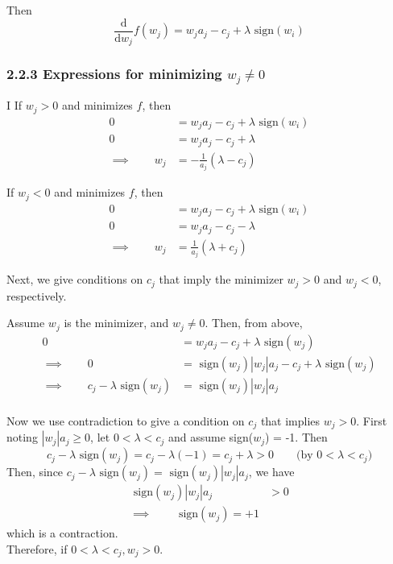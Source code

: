 \documentclass[paper=a4, fontsize=11pt]{scrartcl} %
\numberwithin{equation}{section} %
\numberwithin{figure}{section} %
\numberwithin{table}{section} %
\begin{document}
Then
\[\frac{\textrm{d}}{\textrm{d} w_j}f(w_j) = w_j a_j - c_j + \lambda \textrm{ sign}(w_i)\]

\subsubsection*{2.2.3 Expressions for minimizing $w_j \ne 0$}
I
If $w_j > 0$ and minimizes $f$, then
\begin{align*}
0 &= w_j a_j - c_j + \lambda \textrm{ sign}(w_i) \\
0 &= w_j a_j - c_j + \lambda \\
\implies \qquad{} w_j &= -\frac{1}{a_j} (\lambda - c_j)
\end{align*}

If $w_j < 0$ and minimizes $f$, then
\begin{align*}
0 &= w_j a_j - c_j + \lambda \textrm{ sign}(w_i) \\
0 &= w_j a_j - c_j - \lambda \\
\implies \qquad{} w_j &= \frac{1}{a_j} (\lambda + c_j)
\end{align*}

Next, we give conditions on $c_j$ that imply the minimizer $w_j > 0$ and $w_j < 0$, respectively.

Assume $w_j$ is the minimizer, and $w_j \ne 0$. Then, from above,
\begin{align*}
0 &= w_j a _j - c_j + \lambda\textrm{ sign}(w_j)\\
\implies \qquad{} 0 &= \textrm{ sign}(w_j) |w_j| a _j - c_j + \lambda\textrm{ sign}(w_j)\\
\implies \qquad{} c_j - \lambda \textrm{ sign}(w_j)&=  \textrm{ sign}(w_j) |w_j| a _j \\
\end{align*}

Now we use contradiction to give a condition on $c_j$ that implies $w_j > 0$.
First noting $|w_j|a_j \geq 0$, let $0 < \lambda < c_j$ and assume sign($w_j$) = -1. Then
\[c_j - \lambda \textrm{ sign}(w_j) = c_j - \lambda (-1)  = c_j + \lambda > 0 \qquad \textrm{(by } 0 < \lambda < c_j)\]
Then, since $c_j - \lambda \textrm{ sign}(w_j) =  \textrm{ sign}(w_j) |w_j| a _j $, we have
\begin{align*}
\textrm{ sign}(w_j) |w_j| a _j &>0 \\
\implies \qquad{} \textrm{ sign}(w_j) = +1
\end{align*}
which is a contraction.\\

Therefore, if $0 < \lambda < c_j, w_j >0$.\\
\end{document}
